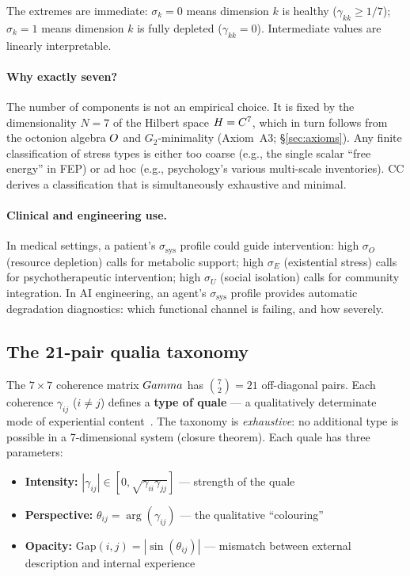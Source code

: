 The extremes are immediate: $\sigma_k = 0$ means dimension $k$ is healthy
($\gamma_{kk} \geq 1/7$); $\sigma_k = 1$ means dimension $k$ is fully depleted
($\gamma_{kk} = 0$).  Intermediate values are linearly interpretable.

\paragraph{Why exactly seven?}
The number of components is not an empirical choice.  It is fixed by the dimensionality
$N = 7$ of the Hilbert space $H = C^7$, which in turn follows from the
octonion algebra $O$ and $G_2$-minimality (Axiom~A3; \S\ref{sec:axioms}).  Any finite
classification of stress types is either too coarse (e.g., the single scalar ``free energy''
in FEP) or ad hoc (e.g., psychology's various multi-scale inventories).  CC derives a
classification that is simultaneously exhaustive and minimal.

\paragraph{Clinical and engineering use.}
In medical settings, a patient's $\sigma_{\mathrm{sys}}$ profile could guide intervention:
high $\sigma_O$ (resource depletion) calls for metabolic support; high $\sigma_E$
(existential stress) calls for psychotherapeutic intervention; high $\sigma_U$
(social isolation) calls for community integration.  In AI engineering, an agent's
$\sigma_{\mathrm{sys}}$ profile provides automatic degradation diagnostics: which
functional channel is failing, and how severely.

\subsection{The 21-pair qualia taxonomy}
\label{subsec:qualia}

The $7 \times 7$ coherence matrix $Gamma$ has $\binom{7}{2} = 21$ off-diagonal pairs.
Each coherence $\gamma_{ij}$ ($i \neq j$) defines a \textbf{type of quale} ---
a qualitatively determinate mode of experiential content~. The taxonomy is
\emph{exhaustive}: no additional type is possible in a 7-dimensional system (closure
theorem). Each quale has three parameters:

\begin{itemize}[leftmargin=2em]
  \item \textbf{Intensity:} $|\gamma_{ij}| \in [0, \sqrt{\gamma_{ii}\gamma_{jj}}]$ ---
        strength of the quale
  \item \textbf{Perspective:} $\theta_{ij} = \arg(\gamma_{ij})$ --- the qualitative
        ``colouring''
  \item \textbf{Opacity:} $\mathrm{Gap}(i,j) = |\sin(\theta_{ij})|$ --- mismatch between
        external description and internal experience
\end{itemize}

